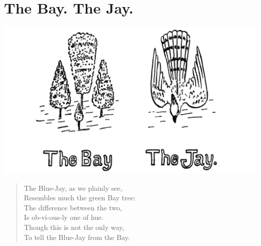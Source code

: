 \documentclass[letterpaper, 10pt, openany]{memoir}
\begin{document}
\chapter{The Bay. The Jay.}
\includegraphics[width=1\textwidth]{f-p23.png}
\vspace{\onelineskip}
\begin{verse}\huge
The Blue-Jay, as we plainly see,\\
Resembles much the green Bay tree:\\
The difference between the two,\\
Is ob-vi-ous-ly one of hue.\\
Though this is not the only way,\\
To tell the Blue-Jay from the Bay.\\
\end{verse}
\end{document}
